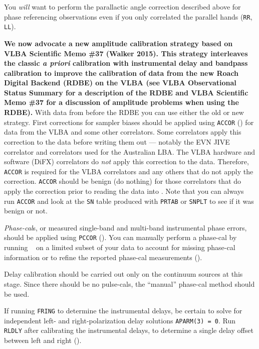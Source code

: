 You {\it will} want to perform the parallactic angle correction
described above for phase referencing observations even if you only
correlated the parallel hands ({\tt RR}, {\tt LL}).

{\bf We now advocate a new amplitude calibration strategy based on VLBA Scientific
Memo \#37 (Walker 2015).  This strategy interleaves the classic {\it a priori}
calibration with instrumental delay and bandpass calibration to improve
the calibration of data from the new Roach Digital Backend (RDBE) on the VLBA
(see VLBA Observational Status
Summary for a description of the RDBE and VLBA Scientific Memo \#37 for a
discussion of  amplitude problems when using the RDBE).}  With data from before
the RDBE you can use either the old or new strategy.
First corrections for sampler biases should be applied using {\tt ACCOR}
() for data from the VLBA and some other correlators.
Some correlators apply this correction to the data before writing them
out --- notably the EVN JIVE correlator and correlators used for the
Australian LBA.  The VLBA hardware and software (DiFX) correlators do
{\it not} apply this correction to the data.  Therefore, {\tt ACCOR}
is required for the VLBA correlators and any others that do not apply
the correction.  {\tt ACCOR} should be benign (do nothing) for those
correlators that do apply the correction prior to reading the data
into \AIPS\@.  Note that you can always run {\tt ACCOR} and look at
the {\tt SN} table produced with {\tt PRTAB} or {\tt SNPLT} to see if
it was benign or not.

{\it Phase-cal\/}s, or measured single-band and multi-band
instrumental phase errors, should be applied using {\tt PCCOR}
().  You can manually perform a phase-cal by running {\tt
{}} on a limited subset of your data to account for missing
phase-cal information or to refine the reported phase-cal measurements
().

Delay calibration should be carried out only on the continuum sources
at this stage.  Since there should be no pulse-cals, the ``manual''
phase-cal method should be used.

If running {\tt FRING} to determine the instrumental delays,
be certain to solve for independent left-
and right-polarization delay solutions {\tt APARM(3) = 0}.  Run {\tt
RLDLY} after calibrating the instrumental delays, to determine a
single delay offset between left and right 
().

